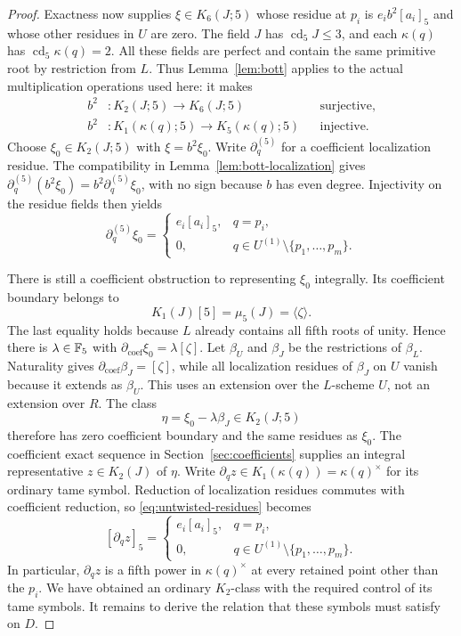\begin{proof}
Exactness now supplies $\xi\in K_6(J;5)$ whose residue at $p_i$ is
$e_i b^2[a_i]_5$ and whose other residues in $U$ are zero.  The field $J$
has $\operatorname{cd}_5J\leq3$, and each $\kappa(q)$ has
$\operatorname{cd}_5\kappa(q)=2$.  All these fields are perfect and contain
the same primitive root by restriction from $L$.  Thus Lemma~\ref{lem:bott}
applies to the actual multiplication operations used here: it makes
\[
 \begin{aligned}
 b^2 &:K_2(J;5)\longrightarrow K_6(J;5)
     &&\text{surjective},\\
 b^2 &:K_1(\kappa(q);5)\longrightarrow K_5(\kappa(q);5)
     &&\text{injective}.
 \end{aligned}
\]
Choose $\xi_0\in K_2(J;5)$ with $\xi=b^2\xi_0$.  Write
$\partial_q^{(5)}$ for a coefficient localization residue.  The
compatibility in Lemma~\ref{lem:bott-localization} gives
$\partial_q^{(5)}(b^2\xi_0)=b^2\partial_q^{(5)}\xi_0$, with no sign
because $b$ has even degree.  Injectivity on the residue fields then yields
\begin{equation}\label{eq:untwisted-residues}
 \partial_q^{(5)}\xi_0=
 \begin{cases}
 e_i[a_i]_5,&q=p_i,\\
 0,&q\in U^{(1)}\setminus\{p_1,\ldots,p_m\}.
 \end{cases}
\end{equation}

There is still a coefficient obstruction to representing $\xi_0$
integrally.  Its coefficient boundary belongs to
\[
 K_1(J)[5]=\mu_5(J)=\langle\zeta\rangle.
\]
The last equality holds because $L$ already contains all fifth roots of
unity.  Hence there is $\lambda\in\mathbb F_5$ with
$\partial_{\mathrm{coef}}\xi_0=\lambda[\zeta]$.  Let $\beta_U$ and
$\beta_J$ be the restrictions of $\beta_L$.  Naturality gives
$\partial_{\mathrm{coef}}\beta_J=[\zeta]$, while all localization residues
of $\beta_J$ on $U$ vanish because it extends as $\beta_U$.  This uses an
extension over the $L$-scheme $U$, not an extension over $R$.  The class
\[
 \eta=\xi_0-\lambda\beta_J\in K_2(J;5)
\]
therefore has zero coefficient boundary and the same residues as $\xi_0$.
The coefficient exact sequence in Section~\ref{sec:coefficients} supplies
an integral representative $z\in K_2(J)$ of $\eta$.  Write
$\partial_q z\in K_1(\kappa(q))=\kappa(q)^\times$ for its ordinary tame
symbol.  Reduction of localization residues commutes with coefficient
reduction, so \eqref{eq:untwisted-residues} becomes
\begin{equation}\label{eq:integral-tame-symbols}
 [\partial_q z]_5=
 \begin{cases}
 e_i[a_i]_5,&q=p_i,\\
 0,&q\in U^{(1)}\setminus\{p_1,\ldots,p_m\}.
 \end{cases}
\end{equation}
In particular, $\partial_q z$ is a fifth power in $\kappa(q)^\times$ at
every retained point other than the $p_i$.  We have obtained an ordinary
$K_2$-class with the required control of its tame symbols.  It remains to
derive the relation that these symbols must satisfy on $D$.


\end{proof}
